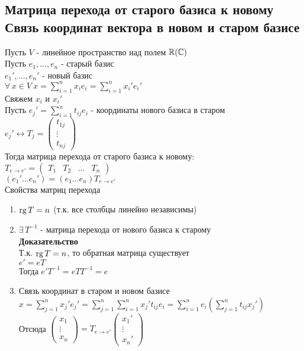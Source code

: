 \documentclass[12pt]{article}
\begin{document}
\subsection{Матрица перехода от старого базиса к новому\\Связь координат вектора в новом и старом базисе}
Пусть $V$ - линейное пространство над полем $\mathbb{R}(\mathbb{C})$\\
Пусть $e_1, \ldots, e_n$ - старый базис\\
$e_1',\ldots,e_n'$ - новый базис\\
$\forall\,x\in V\ x = \sum_{i = 1}^n x_ie_i = \sum_{i=1}^n x_i'e_i'$\\
Свяжем $x_i$ и $x_i'$\\
Пусть $e_j' = \sum_{i=1}^n t_{ij} e_i$ - координаты нового базиса в старом\\
$e_j' \leftrightarrow T_j = \begin{pmatrix}
    t_{1j}\\
    \vdots\\
    t_{nj}
\end{pmatrix}$\\
Тогда матрица перехода от старого базиса к новому:\\
$T_{e \rightarrow e'} = \begin{pmatrix}
    T_1 & T_2 & \ldots & T_n
\end{pmatrix}$\\
$(e_1'\ldots e_n') = (e_1\ldots e_n) T_{e \rightarrow e'}$\\
Свойства матриц перехода
\begin{enumerate}
    \item $\operatorname{rg} T = n$ (т.к. все столбцы линейно независимы)
    \item $\exists\,T^{-1}$ - матрица перехода от нового базиса к старому\\
    \textbf{Доказательство}\\
    Т.к. $\operatorname{rg} T = n$, то обратная матрица существует\\
    $e' = eT$\\
    Тогда $e'T^{-1} = eTT^{-1} = e$\\
    \item Связь координат в старом и новом базисе\\
    $x = \sum_{j=1}^n x_j'e_j' = \sum_{j=1}^n\sum_{i=1}^n x_j't_{ij}e_i = \sum_{i=1}^n e_i(\sum_{j=1}^n t_{ij}x_j')$\\
    Отсюда $\begin{pmatrix}x_1\\\vdots\\x_n\end{pmatrix} = T_{e\rightarrow e'}\begin{pmatrix}x_1'\\\vdots\\x_n'\end{pmatrix}$
\end{enumerate}
\end{document}
